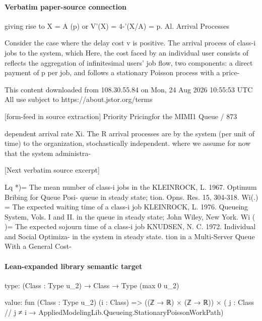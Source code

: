 \documentclass[10pt]{article}
\begin{document}
\paragraph{Verbatim paper-source connection}
\begin{ReviewVerbatim}
giving rise to X = A (p) or V'(X) = 4-'(X/A) = p.                     Al. Arrival Processes

  Consider the case where the delay cost v is positive.               The arrival process of class-i jobs to the system, which
Here, the cost faced by an individual user consists of                reflects the aggregation of infinitesimal users' job flow,
two components: a direct payment of p per job, and                    follows a stationary Poisson process with a price-




                                                 This content downloaded from
                               108.30.55.84 on Mon, 24 Aug 2026 10:55:53 UTC
                                         All use subject to https://about.jstor.org/terms

[form-feed in source extraction]
                                                                                Priority Pricingfor the MIMI1 Queue / 873

dependent arrival rate Xi. The R arrival processes are                 by the system (per unit of time) to the organization,
stochastically independent.                                            where we assume for now that the system administra-

[Next verbatim source excerpt]

 Lq *)= The mean number of class-i jobs in the                          KLEINROCK, L. 1967. Optimum Bribing for Queue Posi-
         queue in steady state;                                              tion. Opns. Res. 15, 304-318.
Wi(.) = The expected waiting time of a class-i job                      KLEINROCK, L. 1976. Queueing System, Vols. I and II.
         in the queue in steady state;                                       John Wiley, New York.
 Wi ( )= The expected sojourn time of a class-i job                     KNUDSEN, N. C. 1972. Individual and Social Optimiza-
         in the system in steady state.                                      tion in a Multi-Server Queue With a General Cost-
\end{ReviewVerbatim}



\paragraph{Lean-expanded library semantic target}
\begin{ReviewVerbatim}
type:
(Class : Type u_2) → Class → Type (max 0 u_2)

value:
fun (Class : Type u_2) (i : Class) =>
  ((ℤ → ℝ) × (ℤ → ℝ)) × ({ j : Class // j ≠ i } → AppliedModelingLib.Queueing.StationaryPoissonWorkPath)
\end{ReviewVerbatim}
\end{document}
